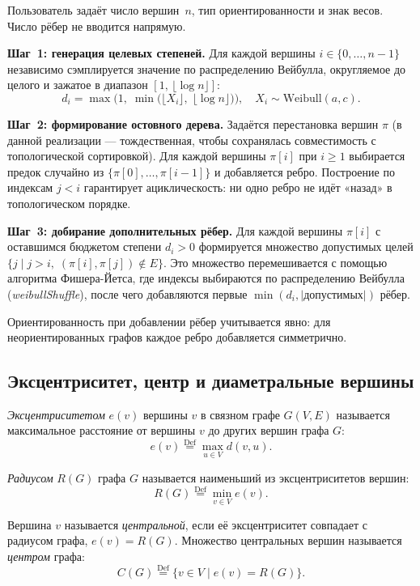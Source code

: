 Пользователь задаёт число вершин~$n$, тип ориентированности и знак весов.
Число рёбер не вводится напрямую.

\textbf{Шаг~1: генерация целевых степеней.}
Для каждой вершины $i \in \{0,\ldots,n-1\}$ независимо сэмплируется
значение по распределению Вейбулла, округляемое до целого и зажатое
в диапазон $[1,\,\lfloor\log n\rfloor]$:
\[
    d_i = \max\!\bigl(1,\; \min\!\bigl(\lfloor X_i \rfloor,\; \lfloor\log n\rfloor\bigr)\bigr),
    \quad X_i \sim \mathrm{Weibull}(a, c).
\]

\textbf{Шаг~2: формирование остовного дерева.}
Задаётся перестановка вершин $\pi$ (в данной реализации --- тождественная,
чтобы сохранялась совместимость с топологической сортировкой).
Для каждой вершины $\pi[i]$ при $i \geq 1$ выбирается предок случайно
из $\{\pi[0], \ldots, \pi[i-1]\}$ и добавляется ребро.
Построение по индексам $j < i$ гарантирует ациклическость: ни одно ребро
не идёт «назад» в топологическом порядке.

\textbf{Шаг~3: добирание дополнительных рёбер.}
Для каждой вершины $\pi[i]$ с оставшимся бюджетом степени $d_i > 0$
формируется множество допустимых целей $\{j \mid j > i,\; (\pi[i],\pi[j]) \notin E\}$.
Это множество перемешивается с помощью алгоритма Фишера-Йетса, где индексы
выбираются по распределению Вейбулла (\textit{weibullShuffle}), после чего
добавляются первые $\min(d_i, |\text{допустимых}|)$ рёбер.

Ориентированность при добавлении рёбер учитывается явно: для неориентированных
графов каждое ребро добавляется симметрично.

\subsection{Эксцентриситет, центр и диаметральные вершины}

\textit{Эксцентриситетом} $e(v)$ вершины $v$ в связном графе $G(V, E)$
называется максимальное расстояние от вершины $v$ до других вершин графа $G$:
\[
e(v) \stackrel{\text{Def}}{=} \max_{u \in V} d(v, u).
\]

\textit{Радиусом} $R(G)$ графа $G$ называется наименьший из эксцентриситетов вершин:
\[
R(G) \stackrel{\text{Def}}{=} \min_{v \in V} e(v).
\]

Вершина $v$ называется \textit{центральной}, если её эксцентриситет совпадает
с радиусом графа, $e(v) = R(G)$. Множество центральных вершин называется
\textit{центром} графа:
\[
C(G) \stackrel{\text{Def}}{=} \{v \in V \mid e(v) = R(G)\}.
\]

